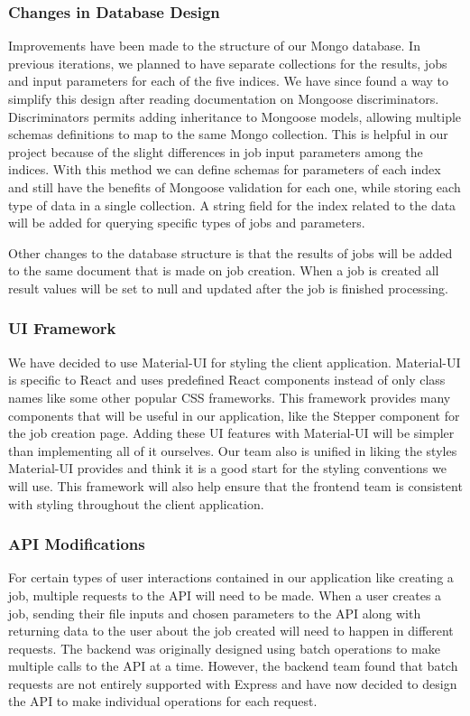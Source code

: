 \subsubsection{Changes in Database Design}
Improvements have been made to the structure of our Mongo database. In previous iterations, we planned to have separate collections for the results, jobs and input parameters for each of the five indices. We have since found a way to simplify this design after reading documentation on Mongoose discriminators. Discriminators permits adding inheritance to Mongoose models, allowing multiple schemas definitions to map to the same Mongo collection. This is helpful in our project because of the slight differences in job input parameters among the indices. With this method we can define schemas for parameters of each index and still have the benefits of Mongoose validation for each one, while storing each type of data in a single collection. A string field for the index related to the data will be added for querying specific types of jobs and parameters.\par
Other changes to the database structure is that the results of jobs will be added to the same document that is made on job creation. When a job is created all result values will be set to null and updated after the job is finished processing.\par

\subsubsection{UI Framework}
We have decided to use Material-UI for styling the client application. Material-UI is specific to React and  uses predefined React components instead of only class names like some other popular CSS frameworks. This framework provides many components that will be useful in our application, like the Stepper component for the job creation page. Adding these UI features with Material-UI will be simpler than implementing all of it ourselves. Our team also is unified in liking the styles Material-UI provides and think it is a good start for the styling conventions we will use. This framework will also help ensure that the frontend team is consistent with styling throughout the client application.\par

\subsubsection{API Modifications}
For certain types of user interactions contained in our application like creating a job, multiple requests to the API will need to be made. When a user creates a job, sending their file inputs and chosen parameters to the API along with returning data to the user about the job created will need to happen in different requests. The backend was originally designed using batch operations to make multiple calls to the API at a time. However, the backend team found that batch requests are not entirely supported with Express and have now decided to design the API to make individual operations for each request.\par